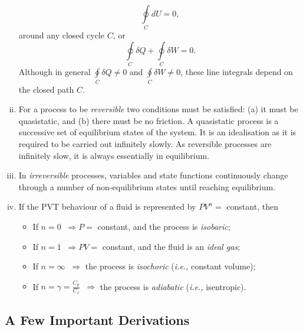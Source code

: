 \documentclass[12pts,a4paper,amsmath,amssymb,floatfix]{article}%
\newcommand{\frc}{\displaystyle\frac}
\newcommand{\ie}{{\it i.e., }}
\begin{document}
\begin{enumerate}[i)]
\begin{displaymath}
             \displaystyle\oint\limits_{C} d U = 0,
          \end{displaymath}
around any closed cycle $C$, or
          \begin{displaymath}
             \displaystyle\oint\limits_{C} \delta Q + \displaystyle\oint\limits_{C} \delta W = 0.
          \end{displaymath}
Although in general $\displaystyle\oint\limits_{C} \delta Q\ne 0$ and $\displaystyle\oint\limits_{C} \delta W\ne 0$, these line integrals depend on the closed path $C$.
%
      \item For a process to be {\it reversible} two conditions must be satisfied: (a) it must be quasistatic, and (b) there must be no friction. A quasistatic process is a successive set of equilibrium states of the system. It is an idealisation as it is required to be carried out infinitely slowly. As reversible processes are infinitely slow, it is always essentially in equilibrium.
%
      \item In {\it irreversible} processes, variables and state functions continuously change through a number of non-equilibrium states until reaching equilibrium.
%
      \item If the PVT behaviour of a fluid is represented by $PV^{n}=$ constant, then
           \begin{itemize}
              \item If $n = 0\;\;\Longrightarrow P =$ constant, and the process is {\it isobaric}; 
              \item If $n = 1\;\;\Longrightarrow PV =$ constant, and the fluid is an {\it ideal gas};
              \item If $n = \infty\;\;\Longrightarrow$ the process is {\it isochoric} (\ie constant volume);
              \item If $n = \gamma=\frc{C_{p}}{C_{v}}\;\;\Longrightarrow$ the process is {\it adiabatic} (\ie isentropic).
           \end{itemize}
%
   \end{enumerate}

\subsection{A Few Important Derivations}
  
\end{document}
